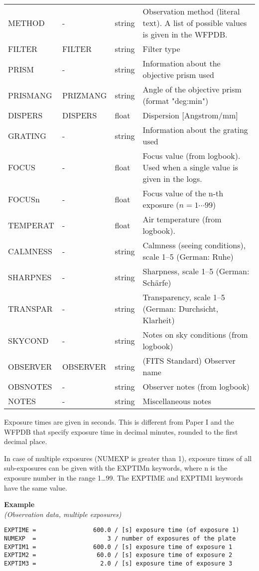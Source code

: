 \documentclass[11pt]{ivoa}
\newenvironment{fitsexample}[1]
{\bigskip\noindent\textbf{Example}\\\textit{(#1\smallskip)}}
{\medskip}
\begin{document}
\begin{longtable}{lllp{}}
METHOD    &-        &string  &
  Observation method (literal text). A list of possible values is given
  in the WFPDB.\\
FILTER    &FILTER   &string  &Filter type\\
PRISM     &-        &string  &
  Information about the objective prism used\\
PRISMANG  &PRIZMANG &string  &
  Angle of the objective prism (format "deg:min")\\
DISPERS   &DISPERS  &float   &Dispersion [Angstrom/mm]\\
GRATING   &-        &string  &Information about the grating used\\
FOCUS     &-        &float   &
  Focus value (from logbook). Used when a single value is given in the
  logs.\\
FOCUSn    &-        &float   &
  Focus value of the n-th exposure ($n = 1\cdots 99$)\\
TEMPERAT  &-        &float   &Air temperature (from logbook).\\
CALMNESS  &-        &string  &
  Calmness (seeing conditions), scale 1–5 (German: Ruhe)\\
SHARPNES  &-        &string  &Sharpness, scale 1–5 (German: Schärfe)\\
TRANSPAR  &-        &string  &
  Transparency, scale 1–5 (German: Durchsicht, Klarheit)\\
SKYCOND   &-        &string  &Notes on sky conditions (from logbook)\\
OBSERVER  &OBSERVER &string  &(FITS Standard) Observer name\\
OBSNOTES  &-        &string  &Observer notes (from logbook)\\
NOTES     &-        &string  &Miscellaneous notes \\

\end{longtable}
\endgroup

Exposure times are given in seconds. This is different from Paper I and
the WFPDB that specify exposure time in decimal minutes, rounded to the
first decimal place.

In case of multiple exposures (NUMEXP is greater than 1), exposure times
of all sub-exposures can be given with the EXPTIMn keywords, where n is
the exposure number in the range 1…99. The EXPTIME and EXPTIM1 keywords
have the same value.


\begin{fitsexample}{Observation data, multiple exposures}
\begin{lstlisting}
EXPTIME =                600.0 / [s] exposure time (of exposure 1)
NUMEXP  =                    3 / number of exposures of the plate
EXPTIM1 =                600.0 / [s] exposure time of exposure 1
EXPTIM2 =                 60.0 / [s] exposure time of exposure 2
EXPTIM3 =                  2.0 / [s] exposure time of exposure 3
\end{lstlisting}
\end{fitsexample}
\end{document}
